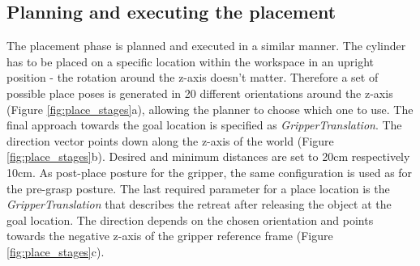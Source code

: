 

\subsection{Planning and executing the placement}

The placement phase is planned and executed in a similar manner. The cylinder has to be placed on a specific location within the workspace in an upright position - the rotation around the z-axis doesn't matter. Therefore a set of possible place poses is generated in 20 different orientations around the z-axis (Figure \ref{fig:place_stages}a), allowing the planner to choose which one to use. The final approach towards the goal location is specified as \emph{GripperTranslation}. The direction vector points down along the z-axis of the world (Figure \ref{fig:place_stages}b). Desired and minimum distances are set to 20cm respectively 10cm. As post-place posture for the gripper, the same configuration is used as for the pre-grasp posture. The last required parameter for a place location is the \emph{GripperTranslation} that describes the retreat after releasing the object at the goal location. The direction depends on the chosen orientation and points towards the negative z-axis of the gripper reference frame (Figure \ref{fig:place_stages}c). 

